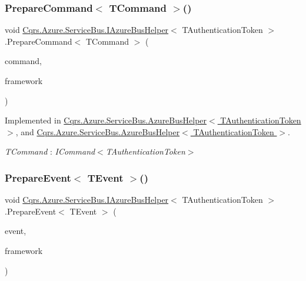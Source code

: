 \subsubsection{\texorpdfstring{Prepare\+Command$<$ T\+Command $>$()}{PrepareCommand< TCommand >()}}
{\footnotesize\ttfamily void \hyperlink{interfaceCqrs_1_1Azure_1_1ServiceBus_1_1IAzureBusHelper}{Cqrs.\+Azure.\+Service\+Bus.\+I\+Azure\+Bus\+Helper}$<$ T\+Authentication\+Token $>$.Prepare\+Command$<$ T\+Command $>$ (\begin{DoxyParamCaption}\item[{T\+Command}]{command,  }\item[{string}]{framework }\end{DoxyParamCaption})}



Implemented in \hyperlink{classCqrs_1_1Azure_1_1ServiceBus_1_1AzureBusHelper_abdcc74e09f97a259f16d04e2af454002}{Cqrs.\+Azure.\+Service\+Bus.\+Azure\+Bus\+Helper$<$ T\+Authentication\+Token $>$}, and \hyperlink{classCqrs_1_1Azure_1_1ServiceBus_1_1AzureBusHelper_abdcc74e09f97a259f16d04e2af454002}{Cqrs.\+Azure.\+Service\+Bus.\+Azure\+Bus\+Helper$<$ T\+Authentication\+Token $>$}.

\begin{Desc}
\item[Type Constraints]\begin{description}
\item[{\em T\+Command} : {\em I\+Command$<$T\+Authentication\+Token$>$}]\end{description}
\end{Desc}
\mbox{\label{interfaceCqrs_1_1Azure_1_1ServiceBus_1_1IAzureBusHelper_ab7d1fa5162adc0f01edcf9039bb43c2c}} 
\subsubsection{\texorpdfstring{Prepare\+Event$<$ T\+Event $>$()}{PrepareEvent< TEvent >()}}
{\footnotesize\ttfamily void \hyperlink{interfaceCqrs_1_1Azure_1_1ServiceBus_1_1IAzureBusHelper}{Cqrs.\+Azure.\+Service\+Bus.\+I\+Azure\+Bus\+Helper}$<$ T\+Authentication\+Token $>$.Prepare\+Event$<$ T\+Event $>$ (\begin{DoxyParamCaption}\item[{T\+Event @}]{event,  }\item[{string}]{framework }\end{DoxyParamCaption})}



